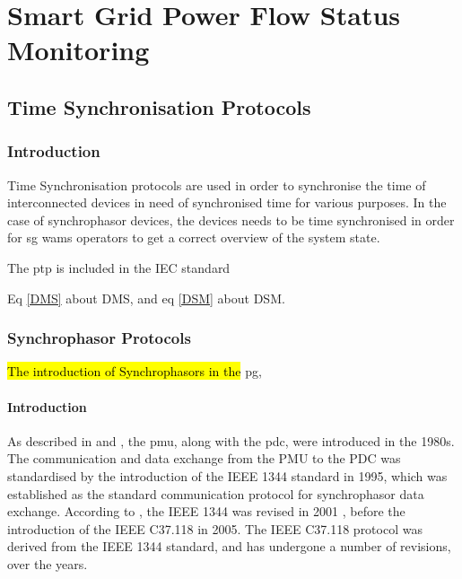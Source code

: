 \chapter{Smart Grid Power Flow Status Monitoring}




\section{Time Synchronisation Protocols}

\subsection{Introduction}
Time Synchronisation protocols are used in order to synchronise the time of interconnected devices in need of synchronised time for various purposes. In the case of synchrophasor devices, the devices needs to be time synchronised in order for \acrshort{sg} \acrshort{wams} operators to get a correct overview of the system state.



The \acrshort{ptp} is included in the IEC standard

Eq \ref{DMS} about DMS, and  eq \ref{DSM} about DSM.






\subsection{Synchrophasor Protocols}

\hl{The introduction of Synchrophasors in the} \acrlong{pg}, 

\subsubsection{Introduction}



As described in \cite{martin2011synchrophasor} and \cite{ali2016performance}, the \acrfull{pmu}, along with the \acrfull{pdc}, were introduced in the 1980s. The communication and data exchange from the PMU to the PDC was standardised by the introduction of the IEEE 1344 standard in 1995, which was established as the standard communication protocol for synchrophasor data exchange. According to \cite{appasani2018review}, the IEEE 1344 was revised in 2001 , before the introduction of the IEEE C37.118 in 2005. The  IEEE C37.118 protocol was derived from the IEEE 1344 standard, and has undergone a number of revisions, over the years.


